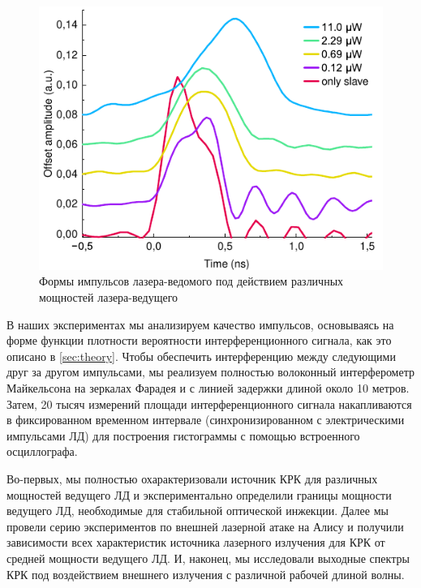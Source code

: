 \begin{figure}
	\centering
	\includegraphics[width=\linewidth]{images/envelope_att.pdf}
	\caption{Формы импульсов лазера-ведомого под действием различных мощностей лазера-ведущего}
	\label{fig:QKD_att}
\end{figure}


В наших экспериментах мы анализируем качество импульсов, основываясь на форме функции плотности вероятности интерференционного сигнала, как это описано в \cref{sec:theory}. Чтобы обеспечить интерференцию между следующими друг за другом импульсами, мы реализуем полностью волоконный интерферометр Майкельсона на зеркалах Фарадея и с линией задержки длиной около 10 метров. Затем, 20 тысяч измерений площади интерференционного сигнала накапливаются в фиксированном временном интервале (синхронизированном с электрическими импульсами ЛД) для построения гистограммы с помощью встроенного осциллографа.

Во-первых, мы полностью охарактеризовали источник КРК для различных мощностей ведущего ЛД и экспериментально определили границы мощности ведущего ЛД, необходимые для стабильной оптической инжекции. Далее мы провели серию экспериментов по внешней лазерной атаке на Алису и получили зависимости всех характеристик источника лазерного излучения для КРК от средней мощности ведущего ЛД. И, наконец, мы исследовали выходные спектры КРК под воздействием внешнего излучения с различной рабочей длиной волны.
